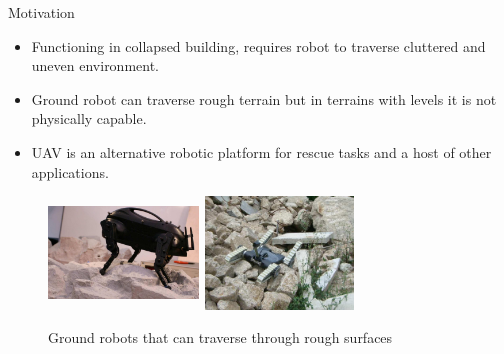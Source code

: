 \documentclass[8pt]{beamer}
\begin{document}
\begin{frame}{Motivation}
  \begin{itemize}
  \setlength\itemsep{1em}
  \item {
    Functioning in collapsed building, requires robot to traverse cluttered and uneven environment.%
  }
  \item {Ground robot can traverse rough terrain but in terrains with levels it is not physically capable.}
 \item {UAV is an alternative robotic platform for rescue tasks and a host of other applications.}
  \end{itemize}
  \begin{figure}[h]
  \centering
\includegraphics[width=4cm, height=3cm]{images/groundrobot1.jpeg}%
\hspace{1cm}
\includegraphics[width=4cm, height=3cm]{images/groundrobot2.jpeg}%
\caption{Ground robots that can traverse through rough surfaces}%
  \label{fig:ground_robots}
\end{figure}
\end{frame}
\end{document}
